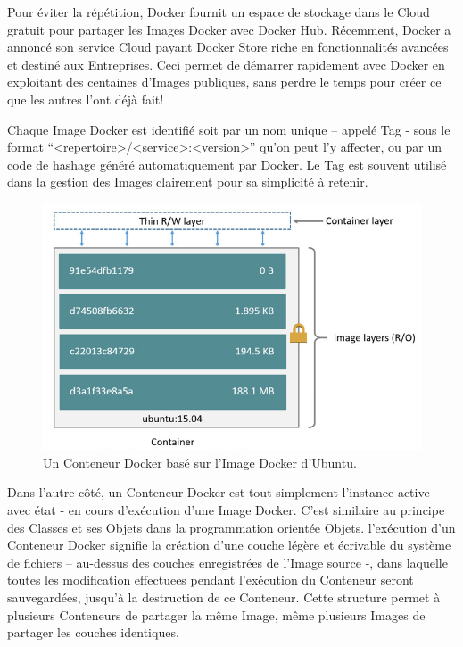 \documentclass[a4paper,11pt,oneside]{report}
\begin{document}
Pour éviter la répétition, Docker fournit un espace de stockage dans le Cloud gratuit pour partager les Images Docker avec Docker Hub. Récemment, Docker a annoncé son service Cloud payant Docker Store riche en fonctionnalités avancées et destiné aux Entreprises. Ceci permet de démarrer rapidement avec Docker en exploitant des centaines d’Images publiques, sans perdre le temps pour créer ce que les autres l’ont déjà fait!
\newline

Chaque Image Docker est identifié soit par un nom unique – appelé Tag - sous le format “<repertoire>/<service>:<version>” qu’on peut l’y affecter, ou par un code de hashage généré automatiquement par Docker. Le Tag est souvent utilisé dans la gestion des Images clairement pour sa simplicité à retenir. 
\newline

\begin{figure}[H]
    \centering
    \includegraphics[width=12cm]{ubuntu-container.png}
    \caption{Un Conteneur Docker basé sur l'Image Docker d'Ubuntu.}
    \label{fig:ubuntu-container}
\end{figure}

Dans l’autre côté, un Conteneur Docker est tout simplement l’instance active – avec état - en cours d’exécution d’une Image Docker. C’est similaire au principe des Classes et ses Objets dans la programmation orientée Objets. l’exécution d’un Conteneur Docker signifie la création d’une couche légère et écrivable du système de fichiers – au-dessus des couches enregistrées de l’Image source -, dans laquelle toutes les modification effectuees pendant l’exécution du Conteneur seront sauvegardées, jusqu’à la destruction de ce Conteneur. Cette structure permet à plusieurs Conteneurs de partager la même Image, même plusieurs Images de partager les couches identiques.
\newline
\end{document}
